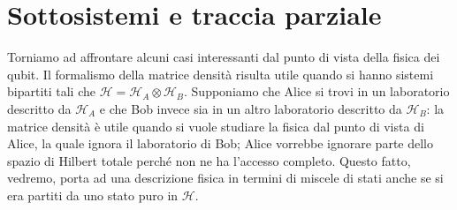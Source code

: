 \section{Sottosistemi e traccia parziale}
Torniamo ad affrontare alcuni casi interessanti dal punto di vista della fisica dei qubit. Il formalismo della matrice densità risulta utile quando si hanno sistemi bipartiti tali che $\mathcal{H} = \mathcal{H}_A \otimes \mathcal{H}_B$. Supponiamo che Alice si trovi in un laboratorio descritto da $\mathcal{H}_A$ e che Bob invece sia in un altro laboratorio descritto da $\mathcal{H}_B$: la matrice densità è utile quando si vuole studiare la fisica dal punto di vista di Alice, la quale ignora il laboratorio di Bob; Alice vorrebbe ignorare parte dello spazio di Hilbert totale perché non ne ha l'accesso completo.  Questo fatto, vedremo, porta ad una descrizione fisica in termini di miscele di stati anche se si era partiti da uno stato puro in $\mathcal{H}$. 

